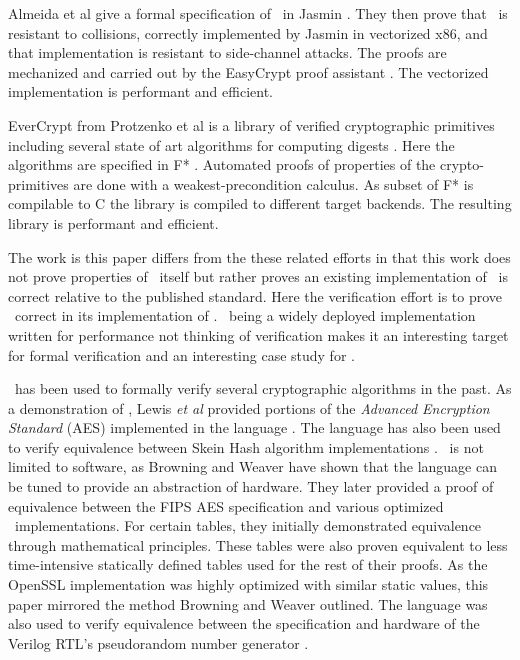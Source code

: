 Almeida et al give a formal specification of \shaThree\ in Jasmin \cite{10.1145/3319535.3363211}.
They then prove that \shaThree\ is resistant to collisions, correctly implemented by Jasmin in vectorized x86, and that implementation is resistant to side-channel attacks.
The proofs are mechanized and carried out by the EasyCrypt proof assistant \cite{easycrypt}.
The vectorized implementation is performant and efficient.

EverCrypt from Protzenko et al is a library of verified cryptographic primitives including several state of art algorithms for computing digests \cite{9152808}.
Here the algorithms are specified in F* \cite{fstar}.
Automated proofs of properties of the crypto-primitives are done with a weakest-precondition calculus.
As subset of F* is compilable to C the library is compiled to different target backends.
The resulting library is performant and efficient.

The work is this paper differs from the these related efforts in that this work does not prove properties of \shaThree\ itself but rather proves an existing implementation of \shaThree\ is correct relative to the published standard.
Here the verification effort is to prove \openssl\ correct in its implementation of \shaThree.
\openssl\ being a widely deployed implementation written for performance not thinking of verification makes it an interesting target for formal verification and an interesting case study for \saw.

\cryptol\ has been used to formally verify several cryptographic algorithms in the past.
As a demonstration of \cryptol, Lewis \emph{et al} provided portions of the \emph{Advanced Encryption Standard} (AES) implemented in the language \cite{crypt-hi}.
The language has also been used to verify equivalence between Skein Hash algorithm implementations \cite{hard-soft}.
\cryptol\ is not limited to software, as Browning and Weaver \cite{design-verif} have shown that the language can be tuned to provide an abstraction of hardware.
They later provided a proof of equivalence between the FIPS AES specification and various optimized \cryptol\ implementations.
For certain tables, they initially demonstrated equivalence through mathematical principles.
These tables were also proven equivalent to less time-intensive statically defined tables used for the rest of their proofs.
As the OpenSSL implementation was highly optimized with similar static values, this paper mirrored the method Browning and Weaver outlined.
The language was also used to verify equivalence between the specification and hardware of the Verilog RTL's pseudorandom number generator \cite{pseudorandom}.

